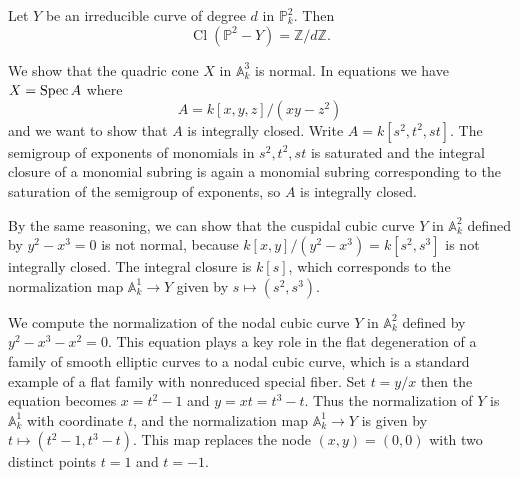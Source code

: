 \documentclass[12pt]{article}
\begin{document}
\begin{example}
    Let $Y$ be an irreducible curve of degree $d$ in $\mathbb P^2_k$. Then
    \[
        \operatorname{Cl}(\mathbb P^2-Y)=\mathbb Z/d\mathbb Z.
    \]
\end{example}

\begin{example}
    We show that the quadric cone $X$ in $\mathbb A^3_k$ is normal. In equations we have $ X=\operatorname{Spec} A$ where
    \[
    A=k[x,y,z]/(xy-z^2)
    \] and we want to show that $A$ is integrally closed. Write $A = k[s^2, t^2, st]$. The semigroup of exponents of monomials in $s^2, t^2, st$ is saturated and the integral closure of a monomial subring is again a monomial subring corresponding to the saturation of the semigroup of exponents, so $A$ is integrally closed.

    By the same reasoning, we can show that the cuspidal cubic curve $Y$ in $\mathbb A^2_k$ defined by $y^2-x^3=0$ is not normal, because $k[x,y]/(y^2-x^3) = k[s^2, s^3]$ is not integrally closed. The integral closure is $k[s]$, which corresponds to the normalization map $\mathbb A^1_k \to Y$ given by $s \mapsto (s^2, s^3)$.
\end{example}

\begin{example}
    We compute the normalization of the nodal cubic curve $Y$ in $\mathbb A^2_k$ defined by $y^2-x^3-x^2=0$. This equation plays a key role in the flat degeneration of a family of smooth elliptic curves to a nodal cubic curve, which is a standard example of a flat family with nonreduced special fiber. Set $t = y/x$ then the equation becomes $x = t^2 - 1$ and $y = xt = t^3 - t$. Thus the normalization of $Y$ is $\mathbb A^1_k$ with coordinate $t$, and the normalization map $\mathbb A^1_k \to Y$ is given by $t \mapsto (t^2 - 1, t^3 - t)$. This map replaces the node $(x,y)=(0,0)$ with two distinct points $t=1$ and $t=-1$.
\end{example}
\end{document}
